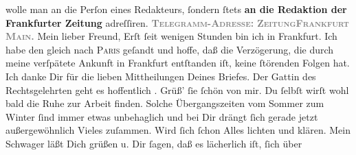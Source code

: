 \begin{ledgroupsized}[t]{13cm}
{{{{{{{                                    wolle man  an die Perſon eines
                                    Redakteurs, ſondern ſtets \textbf{an die Redaktion der
                                          Frankfurter Zeitung} adreſſiren}.}}}}}}\pend
           \pstart
           \textcolor{gray}{\textbf{\textsc{Telegramm-Adreſſe:}}}\pend
           \pstart
           \textcolor{gray}{\textbf{\textsc{ZeitungFrankfurt Main.}}}\pend
           \pstart\center{}Mein lieber Freund,\pend\pstart
           Erſt ſeit wenigen Stunden bin ich in Frankfurt.
               Ich habe den \label{K_L02823-1v}\label{K_L02823-1h} gleich nach \textsc{Paris} geſandt und hoffe, daß die Verzögerung, die
               durch meine verſpätete Ankunft in Frankfurt
               entſtanden iſt, keine ſtörenden Folgen hat.\pend
           \pstart
           Ich danke Dir für die lieben Mittheilungen Deines Briefes. Der Gattin des Rechtsgelehrten geht es hoffentlich \label{K_L02823-2v}\label{K_L02823-2h}. Grüß’ ſie ſchön von mir.\pend
           \pstart
           Du ſelbſt wirſt  wohl bald die \strikeout{\textcolor{gray}{R}} Ruhe zur Arbeit {\pb}finden. Solche Übergangszeiten vom Sommer zum Winter
               ſind immer etwas unbehaglich und bei Dir drängt ſich gerade jetzt außergewöhnlich
               Vieles zuſammen. Wird ſich ſchon Alles lichten und klären.\pend
           \pstart
           Mein Schwager läßt Dich
               grüßen u. Dir ſagen, daß es lächerlich iſt, ſich über \label{K_L02823-3v}
\end{ledgroupsized}
